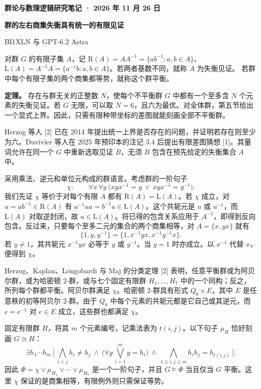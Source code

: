 \documentclass[11pt,a4paper]{article}
\newcommand{\head}[1]{\vspace*{2mm}{\color{green}\large\bfseries #1}\par}
\newcommand{\banner}[1]{{\small\color{green}\bfseries 群论与数理逻辑\hfill #1}\par\vspace{-3pt}{\color{rulecol}\rule{\linewidth}{0.7pt}}\par}
\newcommand{\R}{\mathrm R}
\newcommand{\Lq}{\mathrm L}
\begin{document}
\color{ink}
\banner{研究笔记 · 2026 年 11 月 26 日}
{\fontsize{23}{31}\selectfont\bfseries 群的左右商集失衡具有统一的有限见证}\par
{\small BI1XLN \enspace 与 \enspace GPT-6.2 Astra}

\head{问题与结论}
对群 $G$ 的有限子集 $A$，记 $\R(A)=AA^{-1}=\{ab^{-1}:a,b\in A\}$、
$\Lq(A)=A^{-1}A=\{a^{-1}b:a,b\in A\}$。若两者基数不同，就称 $A$ 为失衡见证。
若群中每个有限子集的两个商集都等势，就称这个群平衡。

\textbf{定理。} 存在与群无关的正整数 $N$，使每个不平衡群 $G$ 中都有一个至多含 $N$ 个元素的失衡见证。若 $G$ 无限，可以取 $N=6$，且六为最优。对全体群，第五节给出一个显式上界。因此，只需有限种带坐标的差图就能刻画全部不平衡群。

Herzog 等人 [2] 已在 2014 年提出统一上界是否存在的问题，并证明若存在则至少为六。Duvivier 等人在 2025 年预印本的注记 3.4 后提出有限差图猜想 [1]。其量词允许在同一个 $G$ 中重新选取见证 $B$，无须 $B$ 包含在预先给定的失衡集合 $A$ 中。

\head{一、用一个一阶句子刻画平衡群}
采用乘法、逆元和单位元构成的群语言。考虑群的一阶句子
\[
  \chi:\qquad \forall x\,\forall y\ \bigl(xyx^{-1}=y\ \lor\ xyx^{-1}=y^{-1}\bigr).
\]
我们先证 $\chi$ 等价于对每个有限 $A$ 都有 $\R(A)=\Lq(A)$。若 $\chi$ 成立，对 $u=ab^{-1}\in\R(A)$ 有 $a^{-1}ua=b^{-1}a\in\Lq(A)$。这个共轭元是 $u$ 或 $u^{-1}$，而 $\Lq(A)$ 对取逆封闭，故 $u\in\Lq(A)$。将已得的包含关系应用于 $A^{-1}$，即得到反向包含。反过来，只要每个至多二元的集合的两个商集相等，对 $A=\{x,yx\}$ 就有
\[
 \{1,y,y^{-1}\}=\{1,x^{-1}yx,x^{-1}y^{-1}x\}.
\]
若 $y\ne1$，其共轭元 $x^{-1}yx$ 必等于 $y$ 或 $y^{-1}$。当 $y=1$ 时亦成立。以 $x^{-1}$ 代替 $x$，便得到 $\chi$。

Herzog、Kaplan、Longobardi 与 Maj 的分类定理 [2] 表明，任意平衡群或为阿贝尔群，或为哈密顿 $2$-群，或与七个固定有限群 $H_1,\ldots,H_7$ 中的一个同构；反之，所列每个群都平衡。阿贝尔群满足 $\chi$。哈密顿 $2$-群具有形式 $Q_8\times E$，其中 $E$ 是任意秩的初等阿贝尔 $2$-群。由于 $Q_8$ 中每个元素的共轭元都是它自己或其逆元，而 $e=e^{-1}$ 对 $e\in E$ 成立，这些群也都满足 $\chi$。

固定有限群 $H$，将其 $m$ 个元素编号，记乘法表为 $t(i,j)$。以下句子 $\mu_H$ 恰好刻画 $G\cong H$：
\[
 \exists h_1\cdots h_m\ 
 \biggl[\ \bigwedge_{i<j}h_i\ne h_j\ \land\
 \biggl(\forall g\,\bigvee_{i=1}^m g=h_i\biggr)\ \land\
 \bigwedge_{1\le i,j\le m}h_i h_j=h_{t(i,j)}\ \biggr].
\]
因此 $\Phi=\chi\vee\mu_{H_1}\vee\cdots\vee\mu_{H_7}$ 是一个一阶句子，并且
$G\models\Phi$ 当且仅当 $G$ 平衡。这里 $\chi$ 保证的是商集相等，有限例外则只需保证等势。
\end{document}
